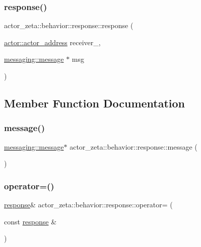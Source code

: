 \subsubsection{\texorpdfstring{response()}{response()}\hspace{0.1cm}{\footnotesize\ttfamily [4/4]}}
{\footnotesize\ttfamily actor\+\_\+zeta\+::behavior\+::response\+::response (\begin{DoxyParamCaption}\item[{\hyperlink{classactor__zeta_1_1actor_1_1actor__address}{actor\+::actor\+\_\+address}}]{receiver\+\_\+,  }\item[{\hyperlink{classactor__zeta_1_1messaging_1_1message}{messaging\+::message} $\ast$}]{msg }\end{DoxyParamCaption})\hspace{0.3cm}{\ttfamily [inline]}}



\subsection{Member Function Documentation}
\mbox{\label{classactor__zeta_1_1behavior_1_1response_a9aa9d35dd338b665fa12ada58b36fe63}} 
\subsubsection{\texorpdfstring{message()}{message()}}
{\footnotesize\ttfamily \hyperlink{classactor__zeta_1_1messaging_1_1message}{messaging\+::message}$\ast$ actor\+\_\+zeta\+::behavior\+::response\+::message (\begin{DoxyParamCaption}{ }\end{DoxyParamCaption})\hspace{0.3cm}{\ttfamily [inline]}}

\mbox{\label{classactor__zeta_1_1behavior_1_1response_affcc0aab81cdc00ff9320dd7fe6048ff}} 
\subsubsection{\texorpdfstring{operator=()}{operator=()}\hspace{0.1cm}{\footnotesize\ttfamily [1/2]}}
{\footnotesize\ttfamily \hyperlink{classactor__zeta_1_1behavior_1_1response}{response}\& actor\+\_\+zeta\+::behavior\+::response\+::operator= (\begin{DoxyParamCaption}\item[{const \hyperlink{classactor__zeta_1_1behavior_1_1response}{response} \&}]{ }\end{DoxyParamCaption})\hspace{0.3cm}{\ttfamily [default]}}

